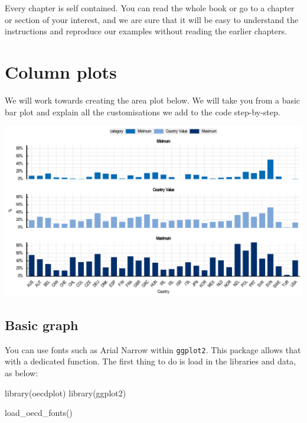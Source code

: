 \documentclass[
  11pt,
  oneside]{report}
\newenvironment{Shaded}{\begin{snugshade}}{\end{snugshade}}
\newcommand{\FunctionTok}[1]{\textcolor[rgb]{0.00,0.00,0.00}{#1}}
\newcommand{\NormalTok}[1]{#1}
\begin{document}
Every chapter is self contained. You can read the whole book or go to a
chapter or section of your interest, and we are sure that it will be
easy to understand the instructions and reproduce our examples without
reading the earlier chapters.

\newpage

\hypertarget{column-plots}{%
\chapter{Column plots}\label{column-plots}}

We will work towards creating the area plot below. We will take you from
a basic bar plot and explain all the customisations we add to the code
step-by-step.

\begin{center}\includegraphics{book_figures/bar_final-1} \end{center}

\hypertarget{basic-graph}{%
\section{Basic graph}\label{basic-graph}}

You can use fonts such as Arial Narrow within \texttt{ggplot2}. This
package allows that with a dedicated function. The first thing to do is
load in the libraries and data, as below:

\begin{Shaded}
\begin{Highlighting}[]
\FunctionTok{library}\NormalTok{(oecdplot)}
\FunctionTok{library}\NormalTok{(ggplot2)}

\FunctionTok{load\_oecd\_fonts}\NormalTok{()}
\end{Highlighting}
\end{Shaded}
\end{document}
